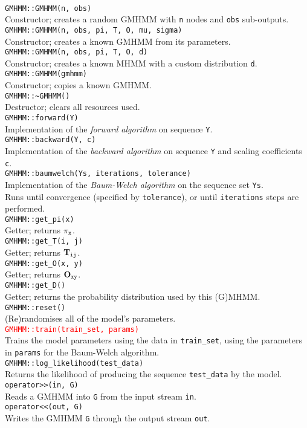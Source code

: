 \documentclass[12pt]{article}
\newcommand{\fundef}[1]{\\\indent\indent\texttt{#1}\\}
\begin{document}
	\hfill\vspace*{-10pt}\fundef{GMHMM::GMHMM(n, obs)}
	Constructor; creates a random GMHMM with {\tt n} nodes and {\tt obs} sub-outputs.
	\fundef{GMHMM::GMHMM(n, obs, pi, T, O, mu, sigma)}
	Constructor; creates a known GMHMM from its parameters.
	\fundef{GMHMM::GMHMM(n, obs, pi, T, O, d)}
	Constructor; creates a known MHMM with a custom distribution {\tt d}.
	\fundef{GMHMM::GMHMM(gmhmm)}
	Constructor; copies a known GMHMM.
	\fundef{GMHMM::\textasciitilde GMHMM()}
	Destructor; clears all resources used.
	\fundef{GMHMM::forward(Y)}
	Implementation of the \emph{forward algorithm} on sequence {\tt Y}.
	\fundef{GMHMM::backward(Y, c)}
	Implementation of the \emph{backward algorithm} on sequence {\tt Y} and scaling coefficients {\tt c}.
	\fundef{GMHMM::baumwelch(Ys, iterations, tolerance)}
	Implementation of the \emph{Baum-Welch algorithm} on the sequence set {\tt Ys}.\\
	Runs until convergence (specified by {\tt tolerance}), or until {\tt iterations} steps are performed.
	\fundef{GMHMM::get\_pi(x)}
	Getter; returns $\pi_{\tt x}$.
	\fundef{GMHMM::get\_T(i, j)}
	Getter; returns ${\bf T}_{\tt ij}$.
	\fundef{GMHMM::get\_O(x, y)}
	Getter; returns ${\bf O}_{\tt xy}$.
	\fundef{GMHMM::get\_D()}
	Getter; returns the probability distribution used by this (G)MHMM.
	\fundef{GMHMM::reset()}
	(Re)randomises all of the model's parameters.
	\textcolor{red}{\fundef{GMHMM::train(train\_set, params)}}
	Trains the model parameters using the data in {\tt train\_set}, using the parameters in {\tt params} for the Baum-Welch algorithm.
	\fundef{GMHMM::log\_likelihood(test\_data)}
	Returns the likelihood of producing the sequence {\tt test\_data} by the model.
	\fundef{operator>\/>(in, G)}
	Reads a GMHMM into {\tt G} from the input stream {\tt in}.
	\fundef{operator<\/<(out, G)}
	Writes the GMHMM {\tt G} through the output stream {\tt out}.
	
\end{document}
